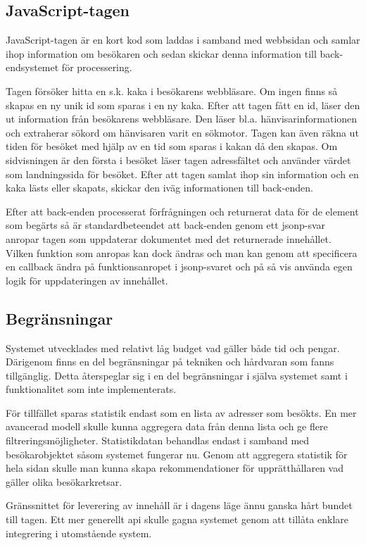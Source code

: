 \subsection{JavaScript-tagen}

JavaScript-tagen är en kort kod som laddas i samband med webbsidan och samlar ihop information om besökaren och sedan skickar denna information till back-endsystemet för processering.

Tagen försöker hitta en s.k. kaka i besökarens webbläsare. Om ingen finns så skapas en ny unik id som sparas i en ny kaka. Efter att tagen fått en id, läser den ut information från besökarens webbläsare. Den läser bl.a. hänvisarinformationen och extraherar sökord om hänvisaren varit en sökmotor. Tagen kan även räkna ut tiden för besöket med hjälp av en tid som sparas i kakan då den skapas. Om sidvisningen är den första i besöket läser tagen adressfältet och använder värdet som landningssida för besöket. Efter att tagen samlat ihop sin information och en kaka lästs eller skapats, skickar den iväg informationen till back-enden.

Efter att back-enden processerat förfrågningen och returnerat data för de element som begärts så är standardbeteendet att back-enden genom ett \gls{jsonp}-svar anropar tagen som uppdaterar dokumentet med det returnerade innehållet. Vilken funktion som anropas kan dock ändras och man kan genom att specificera en callback ändra på funktionsanropet i \gls{jsonp}-svaret och på så vis använda egen logik för uppdateringen av innehållet.

\subsection{Begränsningar}

Systemet utvecklades med relativt låg budget vad gäller både tid och pengar. Därigenom finns en del begränsningar på tekniken och hårdvaran som fanns tillgänglig. Detta återspeglar sig i en del begränsningar i själva systemet samt i funktionalitet som inte implementerats.

För tillfället sparas statistik endast som en lista av adresser som besökts. En mer avancerad modell skulle kunna aggregera data från denna lista och ge flere filtreringsmöjligheter. Statistikdatan behandlas endast i samband med besökarobjektet såsom systemet fungerar nu. Genom att aggregera statistik för hela sidan skulle man kunna skapa rekommendationer för upprätthållaren vad gäller olika besökarkretsar.

Gränssnittet för leverering av innehåll är i dagens läge ännu ganska hårt bundet till tagen. Ett mer generellt \acrshort{api} skulle gagna systemet genom att tillåta enklare integrering i utomstående system.

